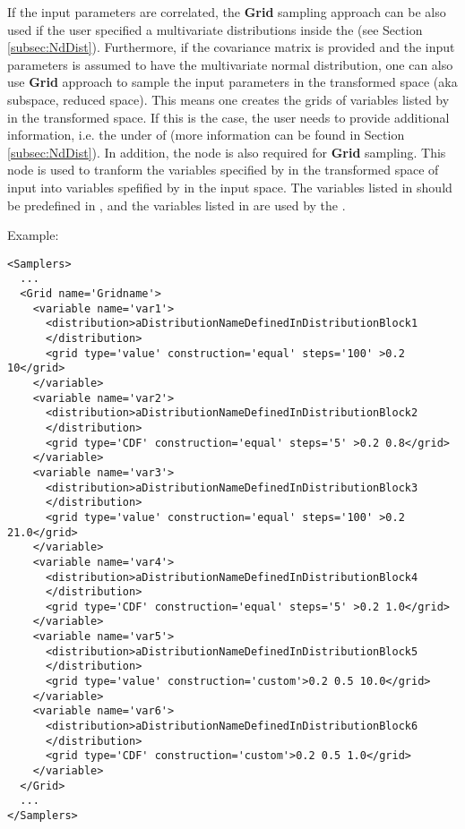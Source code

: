 If the input parameters are correlated, the \textbf{Grid} sampling approach can be also used if the user specified a
multivariate distributions inside the  (see Section \ref{subsec:NdDist}). Furthermore, if the
covariance matrix is provided and the input parameters is assumed to have the multivariate normal distribution, one can also use
\textbf{Grid} approach to sample the input parameters in the transformed space (aka subspace, reduced space). This means one creates
the grids of variables listed by  in the transformed space. If this is the case, the user needs to
provide additional information, i.e. the  under  of 
(more information can be found in Section \ref{subsec:NdDist}). In addition, the node  is also
required for \textbf{Grid} sampling. This node is used to tranform the variables specified by  in the
transformed space of input into variables spefified by  in the input space. The variables listed
in  should be predefined in , and the variables listed in 
are used by the .



Example:
\begin{lstlisting}[style=XML,morekeywords={construction,steps,lowerBound,upperBound}]
<Samplers>
  ...
  <Grid name='Gridname'>
    <variable name='var1'>
      <distribution>aDistributionNameDefinedInDistributionBlock1
      </distribution>
      <grid type='value' construction='equal' steps='100' >0.2 10</grid>
    </variable>
    <variable name='var2'>
      <distribution>aDistributionNameDefinedInDistributionBlock2
      </distribution>
      <grid type='CDF' construction='equal' steps='5' >0.2 0.8</grid>
    </variable>
    <variable name='var3'>
      <distribution>aDistributionNameDefinedInDistributionBlock3
      </distribution>
      <grid type='value' construction='equal' steps='100' >0.2 21.0</grid>
    </variable>
    <variable name='var4'>
      <distribution>aDistributionNameDefinedInDistributionBlock4
      </distribution>
      <grid type='CDF' construction='equal' steps='5' >0.2 1.0</grid>
    </variable>
    <variable name='var5'>
      <distribution>aDistributionNameDefinedInDistributionBlock5
      </distribution>
      <grid type='value' construction='custom'>0.2 0.5 10.0</grid>
    </variable>
    <variable name='var6'>
      <distribution>aDistributionNameDefinedInDistributionBlock6
      </distribution>
      <grid type='CDF' construction='custom'>0.2 0.5 1.0</grid>
    </variable>
  </Grid>
  ...
</Samplers>
\end{lstlisting}

